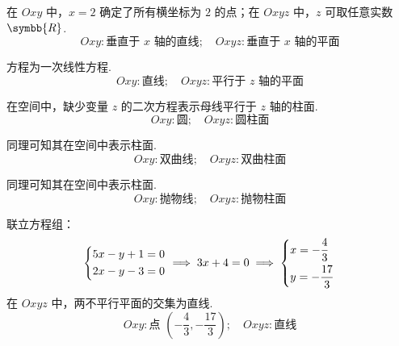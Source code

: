 \begin{solution}

    在 $Oxy$ 中，$x=2$ 确定了所有横坐标为 $2$ 的点；在 $Oxyz$ 中，$z$ 可取任意实数 $\symbb{R}$.
    \begin{equation}
        \boxed{Oxy: \text{垂直于 } x \text{ 轴的直线}; \quad Oxyz: \text{垂直于 } x \text{ 轴的平面}}
    \end{equation}


    方程为一次线性方程.
    \begin{equation}
        \boxed{Oxy: \text{直线}; \quad Oxyz: \text{平行于 } z \text{ 轴的平面}}
    \end{equation}


    在空间中，缺少变量 $z$ 的二次方程表示母线平行于 $z$ 轴的柱面.
    \begin{equation}
        \boxed{Oxy: \text{圆}; \quad Oxyz: \text{圆柱面}}
    \end{equation}


    同理可知其在空间中表示柱面.
    \begin{equation}
        \boxed{Oxy: \text{双曲线}; \quad Oxyz: \text{双曲柱面}}
    \end{equation}


    同理可知其在空间中表示柱面.
    \begin{equation}
        \boxed{Oxy: \text{抛物线}; \quad Oxyz: \text{抛物柱面}}
    \end{equation}


    联立方程组：
    \begin{equation}
        \begin{dcases} 5x - y + 1 = 0 \\ 2x - y - 3 = 0 \end{dcases} \implies 3x + 4 = 0 \implies \begin{dcases} x = -\dfrac{4}{3} \\ y = -\dfrac{17}{3} \end{dcases}
    \end{equation}
    在 $Oxyz$ 中，两不平行平面的交集为直线.
    \begin{equation}
        \boxed{Oxy: \text{点 } \left( -\dfrac{4}{3}, -\dfrac{17}{3} \right); \quad Oxyz: \text{直线}}
    \end{equation}


\end{solution}
